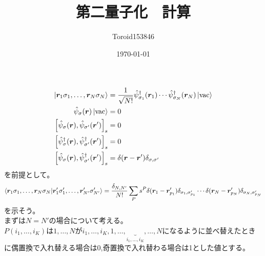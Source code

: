 \documentclass{ltjsarticle}
\title{第二量子化　計算}
\author{Toroid153846}
\date{\today}
\begin{document}
\maketitle


  \begin{align}
    \ket{\bm{r}_1\sigma_1,\dots,\bm{r}_N\sigma_N}&=\frac{1}{\sqrt{N!}}\hat{\psi}_{\sigma_1}^\dag (\bm{r}_1)\cdots\hat{\psi}_{\sigma_N}^\dag (\bm{r}_N)\ket{\rm{vac}} \\
    \hat{\psi}_\sigma (\bm{r})\ket{\rm{vac}}&=0\\
    \comm{\hat{\psi}_\sigma(\bm{r})}{\hat{\psi}_{\sigma'}(\bm{r}')}_s&=0\\
    \comm{\hat{\psi}^\dag_\sigma(\bm{r})}{\hat{\psi}^\dag_{\sigma'}(\bm{r}')}_s&=0\\
    \comm{\hat{\psi}_\sigma(\bm{r})}{\hat{\psi}^\dag_{\sigma'}(\bm{r}')}_s&=\delta(\bm{r}-\bm{r}')\delta_{\sigma,\sigma'}
  \end{align}
を前提として。
\begin{align}
  \braket{\bm{r}_1\sigma_1,\dots,\bm{r}_N\sigma_N}{\bm{r}'_1\sigma'_1,\dots,\bm{r}'_{N'}\sigma'_{N'}}=\frac{\delta_{N,N'}}{N!}\sum_P s^P\delta(\bm{r}_1-\bm{r}'_{p_1})\delta_{\sigma_1,\sigma'_{p_1}}\cdots\delta(\bm{r}_N-\bm{r}'_{p_N})\delta_{\sigma_N,\sigma'_{p_N}}
\end{align}
を示そう。\\
まずは$N=N'$の場合について考える。\\
$P(i_1,\dots,i_K)$は$1,\dots,N$が$i_1,\dots,i_K,1,\dots,\underbrace{}_{i_1,\dots,i_K},\dots,N$になるように並べ替えたときに偶置換で入れ替える場合は0,奇置換で入れ替わる場合は1とした値とする。
\end{document}
